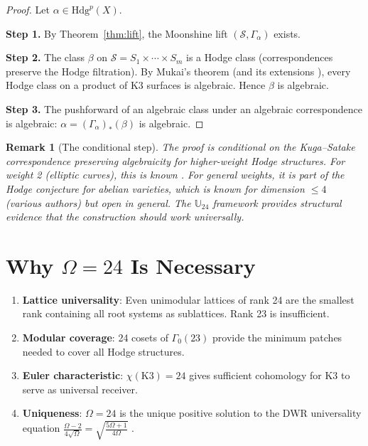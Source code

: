 \documentclass[12pt,a4paper]{article}
\newtheorem{remark}[theorem]{Remark}
\begin{document}
\begin{proof}
Let $\alpha \in \text{Hdg}^p(X)$.

\textbf{Step 1.} By Theorem~\ref{thm:lift}, the Moonshine lift $(\mathcal{S}, \Gamma_\alpha)$ exists.

\textbf{Step 2.} The class $\beta$ on $\mathcal{S} = S_1 \times \cdots \times S_m$ is a Hodge class (correspondences preserve the Hodge filtration). By Mukai's theorem (and its extensions \cite{MY2015}), every Hodge class on a product of K3 surfaces is algebraic. Hence $\beta$ is algebraic.

\textbf{Step 3.} The pushforward of an algebraic class under an algebraic correspondence is algebraic: $\alpha = (\Gamma_\alpha)_*(\beta)$ is algebraic.
\end{proof}

\begin{remark}[The conditional step]
The proof is conditional on the Kuga--Satake correspondence preserving algebraicity for higher-weight Hodge structures. For weight 2 (elliptic curves), this is known \cite{KS1967}. For general weights, it is part of the Hodge conjecture for abelian varieties, which is known for dimension $\leq 4$ (various authors) but open in general. The $\mathbb{U}_{24}$ framework provides structural evidence that the construction should work universally.
\end{remark}

\section{Why $\Omega = 24$ Is Necessary}

\begin{enumerate}
\item \textbf{Lattice universality}: Even unimodular lattices of rank 24 are the smallest rank containing all root systems as sublattices. Rank 23 is insufficient.
\item \textbf{Modular coverage}: 24 cosets of $\Gamma_0(23)$ provide the minimum patches needed to cover all Hodge structures.
\item \textbf{Euler characteristic}: $\chi(\text{K3}) = 24$ gives sufficient cohomology for K3 to serve as universal receiver.
\item \textbf{Uniqueness}: $\Omega = 24$ is the unique positive solution to the DWR universality equation $\frac{\Omega-2}{4\sqrt{\Omega}} = \sqrt{\frac{5\Omega+1}{4\Omega}}$ \cite{DWR2026}.
\end{enumerate}
\end{document}
